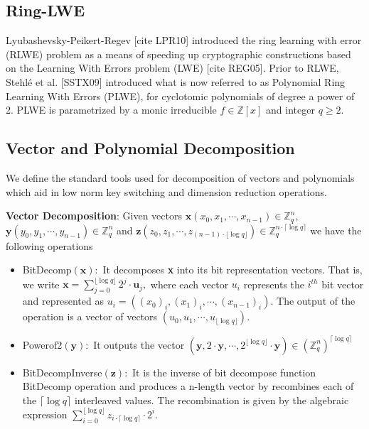 \documentclass[10pt,journal,compsoc]{IEEEtran}
\theoremstyle{definition}
\begin{document}
\subsection{Ring-LWE}
Lyubashevsky-Peikert-Regev [cite LPR10] introduced the ring learning with error (RLWE) problem as a means of speeding up cryptographic constructions based on the Learning With Errors problem (LWE) [cite REG05]. Prior to RLWE, Stehlé et al. [SSTX09] introduced what is now referred to as Polynomial Ring Learning With Errors (PLWE), for cyclotomic polynomials of degree a power of 2. PLWE is parametrized by a monic irreducible $f \in \mathbb{Z}[x]$ and integer $q \geq 2 $.
\subsection{Vector and Polynomial Decomposition}

We define the standard tools used for decomposition of vectors and polynomials which aid in low norm key switching and dimension reduction operations. 

\textbf{Vector Decomposition}: Given vectors $\textbf{x}\left(x_0,x_1,\cdots,x_{n-1}\right) \in \mathbb{Z}_q^n$, $\textbf{y}\left(y_0,y_1,\cdots,y_{n-1}\right)\in \mathbb{Z}_q^n$ and $\textbf{z}\left(z_0,z_1,\cdots,z_{(n-1)\cdot\lfloor \log q \rfloor}\right)\in \mathbb{Z}_q^{n\cdot\lceil \log q \rceil}$ we have the following operations

\begin{itemize}
\item BitDecomp$\left(\textbf{x}\right)\colon$ It decomposes \textbf{x} into its bit representation vectors. That is, we write $\textbf{x} = \sum_{j=0}^{\lfloor \log q \rfloor} 2^j\cdot\textbf{u}_j,$ where each vector $u_i$ represents the $i^{th}$ bit vector and represented as $u_i = \left( (x_0)_i,(x_1)_i,\cdots,\left(x_{n-1}\right)_i\right)$. The output of the operation is a vector of vectors $\left(u_0,u_1,\cdots,u_{\lfloor \log q \rfloor}  \right)$.

\item Powerof2$\left(\textbf{y}\right)\colon$ It outputs the vector $\left( \textbf{y}, 2\cdot\textbf{y},\cdots,2^{\lfloor \log q \rfloor}\cdot \textbf{y} \right) \in \left(\mathbb{Z}_q^n\right)^{\lceil \log q \rceil}$ 

\item BitDecompInverse$\left(\textbf{z}\right)\colon$ It is the inverse of bit decompose function BitDecomp operation and produces a n-length vector by recombines each of the $\lceil \log q \rceil$ interleaved values. The recombination is given by the algebraic expression $\sum_{i=0}^{\lfloor \log q \rfloor}z_{i\cdot\lceil \log q \rceil}\cdot 2^i$.
\end{itemize}
\end{document}

